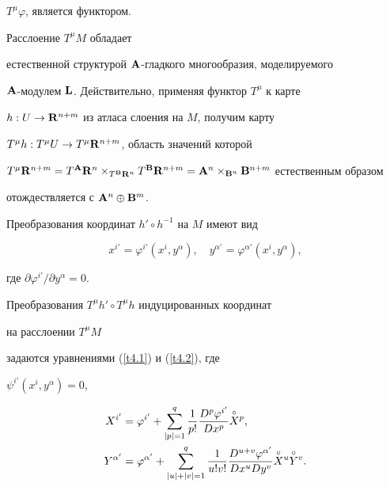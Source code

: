 $T^\mu\varphi$, является функтором.





Расслоение $T^\mu M$ обладает


естественной структурой ${\bold A}$-гладкого многообразия, моделируемого


${\bold A}$-модулем ${\bold L}$. Действительно, применяя функтор $T^\mu$ к карте


$h:U\to{\bold R}^{n+m}$ из атласа слоения на $M$, получим карту


$T^{\mu}h:T^\mu U\to T^\mu{\bold R}^{n+m}$, область значений которой


$T^\mu\R^{n+m}=T^{\A}\R^n\times_{T^{\B}\R^n}T^{\B}\R^{n+m}=


{\A}^n\times_{{\B}^n}{\B}^{n+m}$ естественным образом


отождествляется с ${{\bold A}}^n\oplus{{\bold B}}^m$.


Преобразования координат $h'\circ h^{-1}$ на $M$ имеют вид


\begin{equation}


x^{i'}=\varphi^{i'}(x^i,y^{\alpha}),\quad


y^{\alpha'}=\varphi^{\alpha'}(x^i,y^{\alpha}),


\label{e.4}


\end{equation}


где $\partial\varphi^{i'}/\partial y^\alpha=0$.


Преобразования $T^{\mu}h'\circ T^{\mu}h$ индуцированных координат


на расслоении $T^\mu M$


задаются уравнениями (\ref{t4.1}) и (\ref{t4.2}), где


$\psi^{i'}(x^i,y^\alpha)=0$,


\begin{align} \label{f4.1}


X^{i'}&=\varphi^{i'}+\sum^q_{|p|=1}\frac{1}{p!}


\frac{D^p\varphi^{i'}}{Dx^p}\Xop, \\


%


\label{f4.2}


Y^{\alpha'}&=\varphi^{\alpha'}+\sum^q_{|u|+|v|=1}\frac{1}{u!v!}


\frac{D^{u+v}\varphi^{\alpha'}}{Dx^uDy^v}\overset{\circ}{X}{}^u\overset{\circ}{Y}{}^v.


\end{align}





